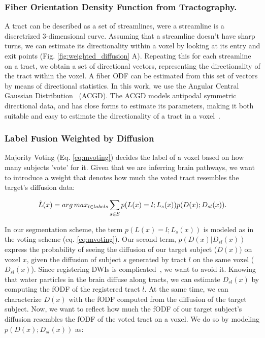 \subsubsection{Fiber Orientation Density Function from Tractography.}
A tract can be described as a set of streamlines, were a streamline is a
discretrized 3-dimensional curve. Assuming that a streamline doesn't have sharp
turns, we can estimate its directionality within a voxel by looking at its
entry and exit points (Fig. \ref{fig:weighted_diffusion} A). Repeating this for each streamline
on a tract, we obtain a set of directional vectors, representing the directionality
of the tract within the voxel. A fiber ODF can be estimated from this set of
vectors by means of directional statistics. In this work, we use the
Angular Central Gaussian Distribution~\cite{Mardia1999} (ACGD). The ACGD models
antipodal symmetric directional data, and has close forms to estimate its
parameters, making it both suitable and easy to estimate the directionality of
a tract in a voxel~\cite{Mardia1999}.

   
\subsubsection{Label Fusion Weighted by Diffusion}
Majority Voting (Eq. \ref{eq:mvoting}) decides the label of a voxel based on
how many subjects 'vote' for it. Given that we are inferring brain pathways,
we want to introduce a weight that denotes how much the voted tract resembles
the target's diffusion data: 

\begin{equation}
\label{eq:mvoting_weighted}
\hat L(x) = arg\,max_{l \in labels} \sum_{s\in S} p(L(x) = l ; L_s(x)) p(D(x) ; D_{sl}(x)).
\end{equation}

In our segmentation scheme, the term $p(L(x) = l ; L_s(x))$ is modeled as in
the voting scheme (eq. \ref{eq:mvoting}). Our second term, $p(D(x) | D_{sl}(x))$
express the probability of seeing the diffusion of our target subject ($D(x)$)
on voxel $x$, given the diffusion of subject $s$ generated by tract $l$ on
the same voxel ($D_{sl}(x)$). Since registering DWIs is complicated~\cite{ODonnell2017},
we want to avoid it. Knowing that water particles in the brain diffuse along
tracts, we can estimate $D_{sl}(x)$ by computing the fODF of the registered tract
$l$. At the same time, we can characterize $D(x)$ with the fODF computed from
the diffusion of the target subject. Now, we want to reflect how much the fODF of
our target subject's diffusion resembles the fODF of the voted tract on a voxel.
We do so by modeling $p(D(x) ; D_{sl}(x))$ as:

